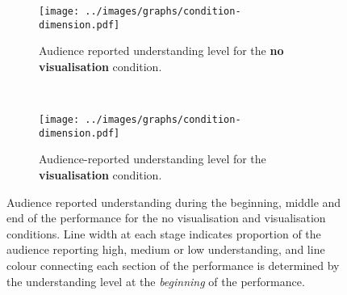 \begin{figure}
\centering
\begin{subfigure}{\textwidth}
  \centering
  \texttt{[image: ../images/graphs/condition-dimension.pdf]}
  \caption[No visualisation condition understanding detailed survey results]{Audience reported understanding level for the \textbf{no visualisation} condition.}
  \label{fig:no-visualisation-understanding}
\end{subfigure}\\
\begin{subfigure}{\textwidth}
  \centering
  \texttt{[image: ../images/graphs/condition-dimension.pdf]}
  \caption[Visualisation condition understanding detailed survey results]{Audience-reported understanding level for the \textbf{visualisation} condition.}
  \label{fig:visualisation-understanding}
\end{subfigure}

\caption[Follow-up user study understanding survey responses]{Audience reported understanding during the beginning, middle and end of the performance for the no visualisation and visualisation conditions. Line width at each stage indicates proportion of the audience reporting high, medium or low understanding, and line colour connecting each section of the performance is determined by the understanding level at the \emph{beginning} of the performance.}
\label{fig:follow-up-user-study-condition-understanding}
\end{figure}